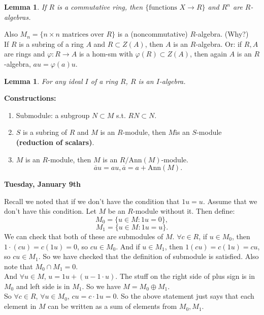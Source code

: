 \documentclass[12pt]{amsbook}
\theoremstyle{plain}
\numberwithin{section}{chapter}
\numberwithin{equation}{chapter}
\newtheorem{lem}[theorem]{Lemma}
\theoremstyle{definition}
\theoremstyle{remark}
\renewcommand{\bar}{\overline}%
\renewcommand{\phi}{\varphi}
\begin{document}
\begin{lem}
If $R$ is a commutative ring, then $\{\text{functions } X\to R\}$ and $R^n$ are $R$-algebras. 
\end{lem}

Also $M_n = \{n \times n \text{ matrices over } R\}$ is a (noncommutative) $R$-algebra. (Why?)\\
If $R$ is a subring of a ring $A$ and $R \subset Z(A)$, then $A$ is an $R$-algebra. Or: if $R,A$ are rings and $\phi:R \to A$ is a hom-sm with $\phi(R) \subset Z(A)$, then again $A$ is an $R$-algebra, $au = \phi(a)u$. 

\begin{lem}
For any ideal $I$ of a ring $R$, $R$ is an $I$-algebra. 
\end{lem}

\textbf{Constructions:}
\begin{enumerate}
\item Submodule: a subgroup $N \subset M$ s.t. $RN \subset N$. 
\item $S$ is a subring of $R$ and $M$ is an $R$-module, then $M$is an $S$-module \textbf{(reduction of scalars)}. 
\item $M$ is an $R$-module, then $M$ is an $R/\text{Ann}(M)$-module. 
$$
\bar{a}u = au, \bar{a} = a + \text{Ann}(M).
$$
\end{enumerate}

\textbf{Tuesday, January 9th}

Recall we noted that if we don't have the condition that $1u = u$. Assume that we don't have this condition. Let $M$ be an $R$-module without it. Then define:
$$
M_0 = \{u \in M: 1u = 0\},
$$
$$
M_1 = \{u \in M: 1u = u\}.
$$
We can check that both of these are submodules of $M$. $\forall c \in R$, if $u \in M_0$, then $1\cdot(cu) = c(1u) = 0$, so $cu \in M_0$.  And if $u \in M_1$, then $1(cu) = c(1u) = cu$, so $cu \in M_1$. So we have checked that the definition of submodule is satisfied. Also note that $M_0 \cap M_1 = 0$. \\
And $\forall u \in M$, $u = 1u + (u - 1\cdot u)$. The stuff on the right side of plus sign is in $M_0$ and left side is in $M_1$. So we have $M = M_0\oplus M_1$. \\
So $\forall c \in R$, $\forall u \in M_0$, $cu = c\cdot1u = 0$. So the above statement just says that each element in $M$ can be written as a sum of elements from $M_0,M_1$. 
\end{document}
